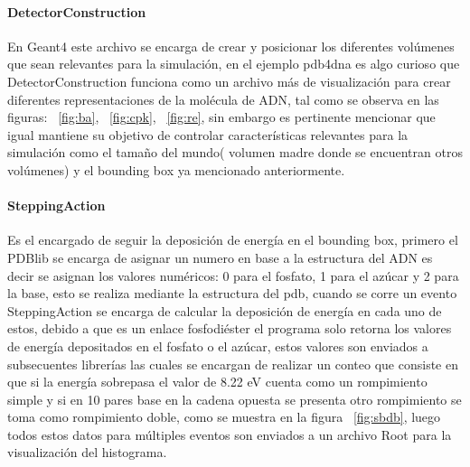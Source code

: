 \paragraph{DetectorConstruction}
En Geant4 este archivo se encarga de crear y posicionar los diferentes volúmenes que sean relevantes para la simulación, en el ejemplo pdb4dna es algo curioso que DetectorConstruction funciona como un archivo más de visualización para crear diferentes representaciones de la molécula de ADN, tal como se observa en las figuras: ~\ref{fig:ba}, ~\ref{fig:cpk}, ~\ref{fig:re}, sin embargo es pertinente mencionar que igual mantiene su objetivo de controlar características relevantes para la simulación como el tamaño del mundo( volumen madre donde se encuentran otros volúmenes) y el bounding box ya mencionado anteriormente.


\paragraph{SteppingAction}
Es el encargado de seguir la deposición de energía en el bounding box, primero el PDBlib se encarga de asignar un numero en base a la estructura del ADN es decir se asignan los valores numéricos: 0 para el fosfato, 1 para el azúcar y 2 para la base, esto se realiza mediante la estructura del pdb, cuando se corre un evento SteppingAction se encarga de calcular la deposición de energía en cada uno de estos, debido a que es un enlace fosfodiéster el programa solo retorna los valores de energía depositados en el fosfato o el azúcar, estos valores son enviados a subsecuentes librerías las cuales se encargan de realizar un conteo que consiste en que si la energía sobrepasa el valor de 8.22 eV cuenta como un rompimiento simple y si en 10 pares base en la cadena opuesta se presenta otro rompimiento se toma como rompimiento doble, como se muestra en la figura ~\ref{fig:sbdb}, luego todos estos datos para múltiples eventos son enviados a un archivo Root para la visualización del histograma.
